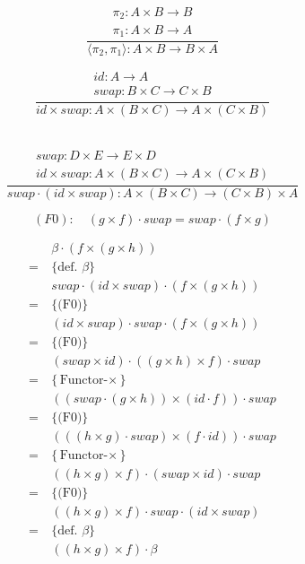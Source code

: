 \documentclass[a4paper,11pt]{article}
\begin{document}
	\begin{minipage}{0.45\textwidth}
		\[
		\frac{
			\begin{array}{c}
				\pi_2: A \times B \rightarrow B \\
				\pi_1: A \times B \rightarrow A
			\end{array}
		}{
			\langle \pi_2, \pi_1 \rangle : A \times B \rightarrow B \times A
		}
		\]
	\end{minipage}
	\hfill
	\begin{minipage}{0.45\textwidth}
		\[
		\frac{
			\begin{array}{c}
				id: A \rightarrow A \\
				swap: B \times C \rightarrow C \times B
			\end{array}
		}{
			id \times swap: A \times (B \times C) \rightarrow A \times (C \times B)
		}
		\]
	\end{minipage}
	\\
	
	\[
		\frac{
			\begin{array}{c}
				swap: D \times E \rightarrow E \times D \\
				id \times swap: A \times (B \times C) \rightarrow A \times (C \times B)
			\end{array}
		}{
			swap \cdot (id \times swap): A \times (B \times C) \rightarrow (C \times B) \times A
		}
	\]
	
	\[
	(F0): \quad (g \times f) \cdot swap = swap \cdot (f \times g)
	\]
	
	\newpage
	
	\[
	\begin{aligned}
		&\beta\cdot (f \times (g \times h)) \\
		= \  &\{\text{def. $\beta$}\}\\
		& swap \cdot (id \times swap) \cdot (f \times (g \times h)) \\
		= \  &\{\text{(F0)}\}\\
		& (id \times swap) \cdot swap \cdot (f \times (g \times h)) \\
		= \  &\{\text{(F0)}\}\\
		& (swap \times id) \cdot ((g \times h) \times f) \cdot swap \\
		= \  &\{\text{Functor-$\times$}\}\\
		& ((swap \cdot (g \times h)) \times (id \cdot f)) \cdot swap\\
		= \  &\{\text{(F0)}\}\\
		& (((h \times g) \cdot swap) \times (f \cdot id)) \cdot swap \\
		= \  &\{\text{Functor-$\times$}\}\\
		& ((h \times g) \times f) \cdot (swap \times id) \cdot swap \\
		= \  &\{\text{(F0)}\}\\
		& ((h \times g) \times f) \cdot swap \cdot (id \times swap) \\
		= \  &\{\text{def. $\beta$}\}\\
		& ((h \times g) \times f) \cdot \beta
	\end{aligned}
	\]
	
\end{document}
